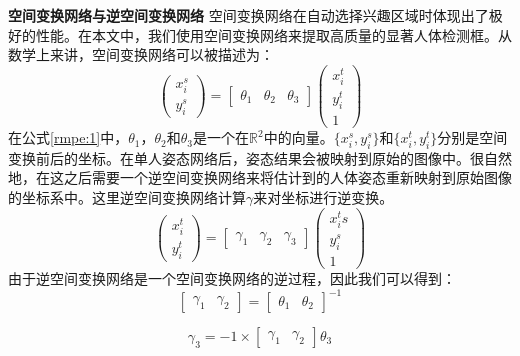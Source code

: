 \textbf{空间变换网络与逆空间变换网络} 空间变换网络在自动选择兴趣区域时体现出了极好的性能。在本文中，我们使用空间变换网络来提取高质量的显著人体检测框。从数学上来讲，空间变换网络可以被描述为：
\begin{equation*}
\label{rmpe:1}
\begin{pmatrix}
x_i^s \\
y_i^s
\end{pmatrix}
= 
\begin{bmatrix}
\theta_1 & \theta_2 & \theta_3
\end{bmatrix}
\begin{pmatrix}
x_i^t \\
y_i^t \\
1
\end{pmatrix}
\end{equation*}
在公式\eqref{rmpe:1}中，$\theta_1$，$\theta_2$和$\theta_3$是一个在$\mathbb{R}^2$中的向量。$\{x_i^s, y_i^s\}$和$\{x_i^t,y_i^t\}$分别是空间变换前后的坐标。在单人姿态网络后，姿态结果会被映射到原始的图像中。很自然地，在这之后需要一个逆空间变换网络来将估计到的人体姿态重新映射到原始图像的坐标系中。这里逆空间变换网络计算$\gamma$来对坐标进行逆变换。
\begin{equation*}
\label{rmpe:2}
\begin{pmatrix}
x_i^t \\
y_i^t
\end{pmatrix}
= 
\begin{bmatrix}
\gamma_1 & \gamma_2 & \gamma_3
\end{bmatrix}
\begin{pmatrix}
x_i^ts\\
y_i^s\\
1
\end{pmatrix}
\end{equation*}
由于逆空间变换网络是一个空间变换网络的逆过程，因此我们可以得到：
\begin{equation*}
\label{rmpe:3}
\begin{bmatrix}
\gamma_1 & \gamma_2
\end{bmatrix}
=
\begin{bmatrix}
\theta_1 & \theta_2
\end{bmatrix}^{-1}
\end{equation*}

\begin{equation*}
\label{rmpe:4}
\gamma_3 = -1 \times 
\begin{bmatrix}
\gamma_1 & \gamma_2
\end{bmatrix}
\theta_3
\end{equation*}

